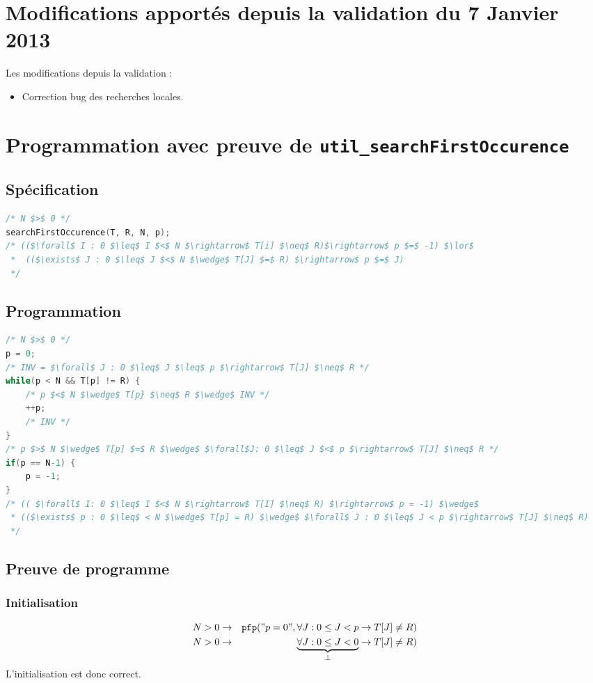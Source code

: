 \documentclass[a4paper, 11pt]{article}
\newcommand{\pfp}{\texttt{pfp}}
\begin{document}
	\section{Modifications apportés depuis la validation du 7 Janvier 2013}
	Les modifications depuis la validation : 
	\begin{itemize}
		\item Correction bug des recherches locales.
	\end{itemize}
	\section{Programmation avec preuve de \texttt{util\_searchFirstOccurence}}
	\subsection{Spécification}
\begin{lstlisting}[language=C]
/* N $>$ 0 */
searchFirstOccurence(T, R, N, p);
/* (($\forall$ I : 0 $\leq$ I $<$ N $\rightarrow$ T[i] $\neq$ R)$\rightarrow$ p $=$ -1) $\lor$ 
 *  (($\exists$ J : 0 $\leq$ J $<$ N $\wedge$ T[J] $=$ R) $\rightarrow$ p $=$ J) 
 */
\end{lstlisting}
\subsection{Programmation}
\begin{lstlisting}[language=C]
/* N $>$ 0 */
p = 0;
/* INV = $\forall$ J : 0 $\leq$ J $\leq$ p $\rightarrow$ T[J] $\neq$ R */
while(p < N && T[p] != R) {
	/* p $<$ N $\wedge$ T[p} $\neq$ R $\wedge$ INV */
	++p;
	/* INV */
}
/* p $>$ N $\wedge$ T[p] $=$ R $\wedge$ $\forall$J: 0 $\leq$ J $<$ p $\rightarrow$ T[J] $\neq$ R */
if(p == N-1) {
	p = -1;
}
/* (( $\forall$ I: 0 $\leq$ I $<$ N $\rightarrow$ T[I] $\neq$ R) $\rightarrow$ p = -1) $\wedge$
 * (($\exists$ p : 0 $\leq$ < N $\wedge$ T[p] = R) $\wedge$ $\forall$ J : 0 $\leq$ J < p $\rightarrow$ T[J] $\neq$ R)
 */
\end{lstlisting}

\subsection{Preuve de programme}
\subsubsection{Initialisation}
\begin{eqnarray*}
	N > 0 &\rightarrow& \pfp ("p=0", \forall J : 0 \leq J < p \rightarrow T[J] \neq R)\\
	N > 0 &\rightarrow& \underbrace{\forall J : 0 \leq J < 0}_{\perp} \rightarrow T[J] \neq R)
\end{eqnarray*}
L'initialisation est donc correct.
\end{document}
